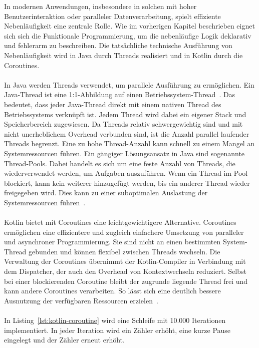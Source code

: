 \documentclass[11pt]{article}
\begin{document}
    In modernen Anwendungen, insbesondere in solchen mit hoher Benutzerinteraktion oder paralleler Datenverarbeitung, spielt effiziente Nebenläufigkeit eine zentrale Rolle.
    Wie im vorherigen Kapitel beschrieben eignet sich sich die Funktionale Programmierung, um die nebenläufige Logik deklarativ und fehlerarm zu beschreiben.
    Die tatsächliche technische Ausführung von Nebenläufigkeit wird in Java durch Threads realisiert und in Kotlin durch die Coroutines.\\
    \\
    In Java werden Threads verwendet, um parallele Ausführung zu ermöglichen.
    Ein Java-Thread ist eine 1:1-Abbildung auf einen Betriebssystem-Thread~\cite[940]{insel}.
    Das bedeutet, dass jeder Java-Thread direkt mit einem nativen Thread des Betriebssystems verknüpft ist.
    Jedem Thread wird dabei ein eigener Stack und Speicherbereich zugewiesen.
    Da Threads relativ schwergewichtig sind und mit nicht unerheblichem Overhead verbunden sind, ist die Anzahl parallel laufender Threads begrenzt.
    Eine zu hohe Thread-Anzahl kann schnell zu einem Mangel an Systemressourcen führen.
    Ein gängiger Lösungsansatz in Java sind sogenannte Thread-Pools.
    Dabei handelt es sich um eine feste Anzahl von Threads, die wiederverwendet werden, um Aufgaben auszuführen.
    Wenn ein Thread im Pool blockiert, kann kein weiterer hinzugefügt werden, bis ein anderer Thread wieder freigegeben wird.
    Dies kann zu einer suboptimalen Auslastung der Systemressourcen führen~\cite[965-966]{insel}.\\
    \\
    Kotlin bietet mit Coroutines eine leichtgewichtigere Alternative.
    Coroutines ermöglichen eine effizientere und zugleich einfachere Umsetzung von paralleler und asynchroner Programmierung.
    Sie sind nicht an einen bestimmten System-Thread gebunden und können flexibel zwischen Threads wechseln.
    Die Verwaltung der Coroutines übernimmt der Kotlin-Compiler in Verbindung mit dem Dispatcher, der auch den Overhead von Kontextwechseln reduziert.
    Selbst bei einer blockierenden Coroutine bleibt der zugrunde liegende Thread frei und kann andere Coroutines verarbeiten.
    So lässt sich eine deutlich bessere Ausnutzung der verfügbaren Ressourcen erzielen~\cite[194]{kotlin-patterns}.\\
    \\
    In Listing~\ref{lst:kotlin-coroutine} wird eine Schleife mit 10.000 Iterationen implementiert.
    In jeder Iteration wird ein Zähler erhöht, eine kurze Pause eingelegt und der Zähler erneut erhöht.
\end{document}
